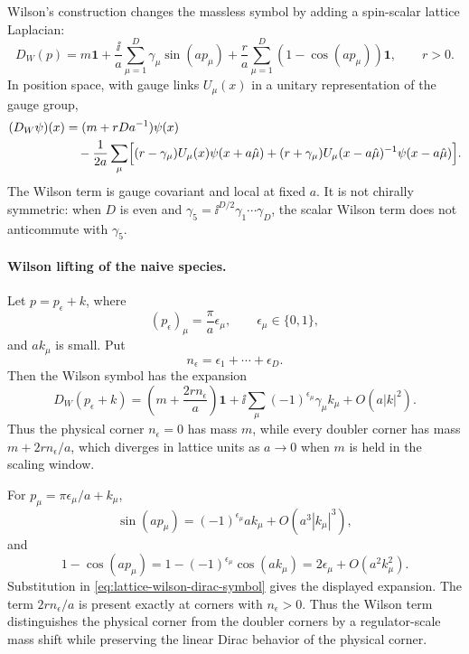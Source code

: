 Wilson's construction changes the massless symbol by adding a spin-scalar
lattice Laplacian:
\begin{equation}
  D_W(p)
  =
  m\mathbf 1
  +\frac{\ii}{a}\sum_{\mu=1}^D\gamma_\mu\sin(ap_\mu)
  +\frac{r}{a}\sum_{\mu=1}^D(1-\cos(ap_\mu))\mathbf 1 ,
  \qquad r>0 .
  \label{eq:lattice-wilson-dirac-symbol}
\end{equation}
In position space, with gauge links \(U_\mu(x)\) in a unitary
representation of the gauge group,
\begin{equation}
\begin{aligned}
  (D_W\psi)(x)
  &=
  (m+rDa^{-1})\psi(x)                                      \\
  &\quad
  -\frac1{2a}\sum_\mu
  \Bigl[
    (r-\gamma_\mu)U_\mu(x)\psi(x+a\hat\mu)
    +(r+\gamma_\mu)U_\mu(x-a\hat\mu)^{-1}\psi(x-a\hat\mu)
  \Bigr].
\end{aligned}
  \label{eq:lattice-wilson-dirac-position}
\end{equation}
The Wilson term is gauge covariant and local at fixed \(a\).  It is not
chirally symmetric: when \(D\) is even and
\(\gamma_5=\ii^{D/2}\gamma_1\cdots\gamma_D\), the scalar Wilson term does
not anticommute with \(\gamma_5\).

\paragraph{Wilson lifting of the naive species.}
Let \(p=p_\epsilon+k\), where
\[
  (p_\epsilon)_\mu=\frac{\pi}{a}\epsilon_\mu,\qquad
  \epsilon_\mu\in\{0,1\},
\]
and \(ak_\mu\) is small.  Put
\[
  n_\epsilon=\epsilon_1+\cdots+\epsilon_D .
\]
Then the Wilson symbol has the expansion
\[
  D_W(p_\epsilon+k)
  =
  \left(m+\frac{2rn_\epsilon}{a}\right)\mathbf 1
  +\ii\sum_\mu(-1)^{\epsilon_\mu}\gamma_\mu k_\mu
  +O(a|k|^2).
\]
Thus the physical corner \(n_\epsilon=0\) has mass \(m\), while every
doubler corner has mass \(m+2rn_\epsilon/a\), which diverges in lattice
units as \(a\to0\) when \(m\) is held in the scaling window.

For \(p_\mu=\pi\epsilon_\mu/a+k_\mu\),
\[
  \sin(ap_\mu)=(-1)^{\epsilon_\mu}ak_\mu+O(a^3|k_\mu|^3),
\]
and
\[
  1-\cos(ap_\mu)
  =
  1-(-1)^{\epsilon_\mu}\cos(ak_\mu)
  =
  2\epsilon_\mu+O(a^2k_\mu^2).
\]
Substitution in \eqref{eq:lattice-wilson-dirac-symbol} gives the displayed
expansion.
The term \(2rn_\epsilon/a\) is present exactly at corners with
\(n_\epsilon>0\).  Thus the Wilson term distinguishes the physical corner
from the doubler corners by a regulator-scale mass shift while preserving the
linear Dirac behavior of the physical corner.

